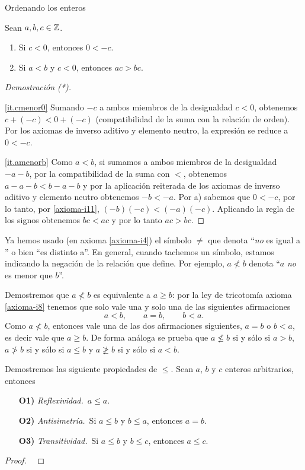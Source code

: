 \begin{section}{Ordenando los enteros}
\begin{proposicion}\label{prop-compatibilidad-negativa}
    Sean $a, b, c \in {\mathbb Z}$.  
    \begin{enumerate}[label=\textit{\alph*)}]
        \item\label{it.cmenor0} Si $c < 0$, entonces $0 < -c$.
        \item\label{it.amenorb} Si $a< b$ y $c< 0$, entonces $ac > bc$. 
    \end{enumerate}
\end{proposicion}
\begin{proof}[Demostración (*)] {${}^{}$}
    
    \ref{it.cmenor0} Sumando $-c$ a ambos miembros de la desigualdad $c < 0$, obtenemos $c + (-c) < 0 + (-c)$ (compatibilidad de la suma con la relación de orden). Por los axiomas de inverso aditivo y elemento neutro, la expresión se reduce a $0 < -c$.
    
    \ref{it.amenorb} Como $a < b$, si sumamos a ambos miembros de la desigualdad $-a -b$, por la compatibilidad  de la suma con $<$, obtenemos $a -a -b < b -a -b$ y por la aplicación reiterada de los axiomas de inverso aditivo y elemento neutro  obtenemos $-b < -a$. Por a) sabemos que $0< -c$, por lo tanto, por \ref{axioma-i11}, $(-b)(-c) < (-a)(-c)$. Aplicando la regla de los signos obtenemos $bc < ac$ y por lo tanto $ac > bc$.

\end{proof}

Ya hemos usado (en axioma \ref{axioma-i4}) el símbolo $\not=$ que denota  ``{\em no} es igual a '' o bien ``es distinto a''.   En  general, cuando tachemos un símbolo, estamos indicando la negación de la relación que define. Por ejemplo, $a\not< b$ denota ``$a$ {\em no} es menor que $b$''. 

\begin{observacion*} Demostremos que  $a\not< b$ es equivalente a $a\ge b$: por la ley de tricotomía axioma \ref{axioma-i8} tenemos que solo vale una y solo una de las siguientes afirmaciones
$$
a<b, \qquad a = b, \qquad b < a.
$$
Como  $a\not< b$, entonces vale una de las dos afirmaciones siguientes, $a=b$ o $b<a$, es decir  vale que $a \ge b$. De forma análoga se prueba que $a\not\le b$ si  y sólo si $a>b$, $a\not> b$ si  y sólo si $a \le b$ y $a\not\ge b$ si  y sólo si $a<b$.

\end{observacion*}


\begin{ejemplo}\label{relaciondeorden}
Demostremos las siguiente propiedades de $\le$. Sean  $a$, $b$ y $c$  enteros arbitrarios,  entonces
\begin{enumerate}
\item[\textbf{O1)}] {\em Reflexividad.}\, $a \le a$.
\item[\textbf{O2)}] {\em Antisimetría.}\, Si $a \le b$ y $b \le a$, entonces $a=b$.
\item[\textbf{O3)}] {\em Transitividad.}\, Si $a\le b$ y $b\le c$, entonces $a \le c$.
\end{enumerate}
\begin{proof}
\
    

\end{proof}
\end{ejemplo}
\end{section}
